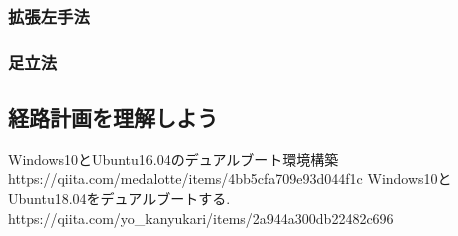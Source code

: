 \documentclass[11pt,a4paper]{jsarticle}
\begin{document}
\newpage
\subsubsection{拡張左手法}



\subsubsection{足立法}





\newpage
\subsection{経路計画を理解しよう}



%


\begin{thebibliography}{99}
 Windows10とUbuntu16.04のデュアルブート環境構築\\https://qiita.com/medalotte/items/4bb5cfa709e93d044f1c
 Windows10とUbuntu18.04をデュアルブートする.\\https://qiita.com/yo\_kanyukari/items/2a944a300db22482c696
\end{thebibliography}%
%
\end{document}
